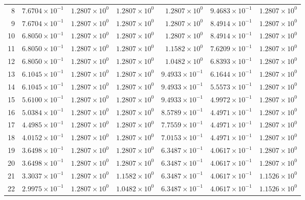 \begin{table}[H]
\begin{tabular}{@{}rrrrrrr@{}}
8 & $7.6704\times10^{-1}$ & $1.2807\times10^{0}$ & $1.2807\times10^{0}$ & $1.2807\times10^{0}$ & $9.4683\times10^{-1}$ & $1.2807\times10^{0}$\\
9 & $7.6704\times10^{-1}$ & $1.2807\times10^{0}$ & $1.2807\times10^{0}$ & $1.2807\times10^{0}$ & $8.4914\times10^{-1}$ & $1.2807\times10^{0}$\\
10 & $6.8050\times10^{-1}$ & $1.2807\times10^{0}$ & $1.2807\times10^{0}$ & $1.2807\times10^{0}$ & $8.4914\times10^{-1}$ & $1.2807\times10^{0}$\\
11 & $6.8050\times10^{-1}$ & $1.2807\times10^{0}$ & $1.2807\times10^{0}$ & $1.1582\times10^{0}$ & $7.6209\times10^{-1}$ & $1.2807\times10^{0}$\\
12 & $6.8050\times10^{-1}$ & $1.2807\times10^{0}$ & $1.2807\times10^{0}$ & $1.0482\times10^{0}$ & $6.8393\times10^{-1}$ & $1.2807\times10^{0}$\\
13 & $6.1045\times10^{-1}$ & $1.2807\times10^{0}$ & $1.2807\times10^{0}$ & $9.4933\times10^{-1}$ & $6.1644\times10^{-1}$ & $1.2807\times10^{0}$\\
14 & $6.1045\times10^{-1}$ & $1.2807\times10^{0}$ & $1.2807\times10^{0}$ & $9.4933\times10^{-1}$ & $5.5573\times10^{-1}$ & $1.2807\times10^{0}$\\
15 & $5.6100\times10^{-1}$ & $1.2807\times10^{0}$ & $1.2807\times10^{0}$ & $9.4933\times10^{-1}$ & $4.9972\times10^{-1}$ & $1.2807\times10^{0}$\\
16 & $5.0384\times10^{-1}$ & $1.2807\times10^{0}$ & $1.2807\times10^{0}$ & $8.5789\times10^{-1}$ & $4.4971\times10^{-1}$ & $1.2807\times10^{0}$\\
17 & $4.4985\times10^{-1}$ & $1.2807\times10^{0}$ & $1.2807\times10^{0}$ & $7.7559\times10^{-1}$ & $4.4971\times10^{-1}$ & $1.2807\times10^{0}$\\
18 & $4.0152\times10^{-1}$ & $1.2807\times10^{0}$ & $1.2807\times10^{0}$ & $7.0153\times10^{-1}$ & $4.4971\times10^{-1}$ & $1.2807\times10^{0}$\\
19 & $3.6498\times10^{-1}$ & $1.2807\times10^{0}$ & $1.2807\times10^{0}$ & $6.3487\times10^{-1}$ & $4.0617\times10^{-1}$ & $1.2807\times10^{0}$\\
20 & $3.6498\times10^{-1}$ & $1.2807\times10^{0}$ & $1.2807\times10^{0}$ & $6.3487\times10^{-1}$ & $4.0617\times10^{-1}$ & $1.2807\times10^{0}$\\
21 & $3.3037\times10^{-1}$ & $1.2807\times10^{0}$ & $1.1582\times10^{0}$ & $6.3487\times10^{-1}$ & $4.0617\times10^{-1}$ & $1.1526\times10^{0}$\\
22 & $2.9975\times10^{-1}$ & $1.2807\times10^{0}$ & $1.0482\times10^{0}$ & $6.3487\times10^{-1}$ & $4.0617\times10^{-1}$ & $1.1526\times10^{0}$\\

\end{tabular}
\end{table}
